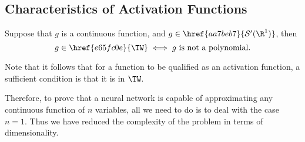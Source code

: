 \subsection{Characteristics of Activation Functions}\label{f62a70d}

\Theorem{}\label{dc8bd2e}

Suppose that $g$ is a continuous function, and $g\in \href{aa7beb7}{\mathcal
S'(\R^1)}$, then
$$
  g\in\href{e65fc0e}{\TW}\iff\text{$g$ is not a polynomial.}
$$

Note that it follows that for a function to be qualified as an activation
function, a sufficient condition is that it is in $\TW$.

%

Therefore, to prove that a neural network is capable of approximating any
continuous function of $n$ variables, all we need to do is to deal with the
case $n=1$. Thus we have reduced the complexity of the problem in terms of
dimensionality.

